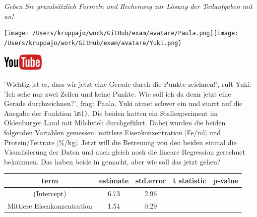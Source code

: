 \documentclass[a4paper, 9pt]{scrartcl}\usepackage[]{graphicx}\usepackage[]{xcolor}
\begin{document}
\textit{Geben Sie grundsätzlich Formeln und Rechenweg zur Lösung der Teilaufgaben mit an!} \\[1Ex]
 

 
\begin{minipage}[t]{0.5\textwidth}
\texttt{[image: /Users/kruppajo/work/GitHub/exam/avatare/Paula.png]}\hspace{-4mm}\texttt{[image: /Users/kruppajo/work/GitHub/exam/avatare/Yuki.png]}
\end{minipage}
\begin{minipage}[t]{0.5\textwidth}
\hfill
\href{https://youtu.be/lJp8rFmMnrs}{\includegraphics[width = 2cm]{img/youtube}}
\end{minipage}
\vspace{1ex}



'Wichtig ist es, dass wir jetzt eine Gerade durch die Punkte zeichnen!', ruft Yuki. 'Ich sehe nur zwei Zeilen und keine Punkte. Wie soll ich da denn jetzt eine Gerade durchzeichnen?', fragt Paula. Yuki atmet schwer ein und starrt auf die \Rlogo Ausgabe der Funktion \texttt{lm()}. Die beiden hatten ein Stallexperiment im Oldenburger Land mit Milchvieh durchgeführt. Dabei wurden die beiden folgenden Variablen gemessen: mittlere Eisenkonzentration [Fe/ml] und Protein/Fettrate [\%/kg]. Jetzt will die Betreuung von den beiden einmal die Visualisierung der Daten und auch gleich noch die lineare Regression gerechnet bekommen. Das haben beide in \Rlogo gemacht, aber wie soll das jetzt gehen?

\begin{table}[!h]
\centering\begingroup\fontsize{12}{14}\selectfont

\begin{tabular}{ccccc}
\toprule
term & estimate & std.error & t statistic & p-value\\
\midrule
(Intercept) & 6.73 & 2.96 &  & \\
Mittlere Eisenkonzentration & 1.54 & 0.29 &  & \\
\bottomrule
\end{tabular}
\endgroup{}
\end{table}
\end{document}

